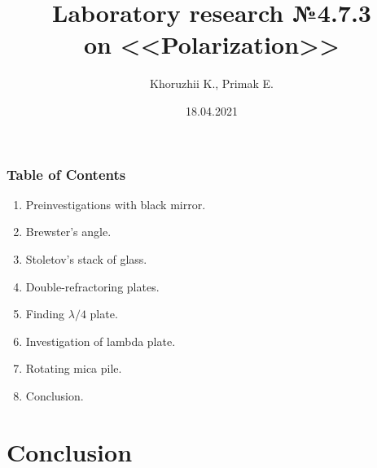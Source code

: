\documentclass[]{beamer}
\title[Lab 4.7.3]{Laboratory research №4.7.3 \\ on <<Polarization>>}
\author{Khoruzhii K., Primak E.}
\institute[MIPT]
\begin{document}
\date{18.04.2021}
\maketitle


\begin{frame}
    \frametitle{Table of Contents}
    \begin{enumerate}
        \item Preinvestigations with black mirror.
        \item Brewster's angle.
        \item Stoletov's stack of glass.
        \item Double-refractoring plates.
        \item Finding $\lambda/4$ plate.
        \item Investigation of lambda plate.
        \item Rotating mica pile.
        \item Conclusion.
    \end{enumerate}
\end{frame}


% 


\section{Conclusion}
\end{document}
